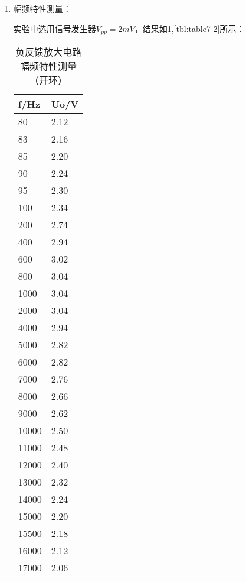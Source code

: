 \documentclass[dvipsnames, svgnames,a4paper,11pt]{article}
\begin{document}
\begin{itemize}
\begin{enumerate}
				\item 幅频特性测量：
				
					实验中选用信号发生器$V_{pp}=2mV$，结果如\cref{tbl:table7-1},\cref{tbl:table7-2}所示：
					
					\begin{table}[htbp]
						\begin{minipage}{.5\linewidth}
							\centering
							\begin{tabular}{|ll|} 
								\hline
								f/Hz  & Uo/V  \\ 
								\hline
								80    & 2.12  \\
								83    & 2.16  \\
								85    & 2.20  \\
								90    & 2.24  \\
								95    & 2.30  \\
								100   & 2.34  \\
								200   & 2.74  \\
								400   & 2.94  \\
								600   & 3.02  \\
								800   & 3.04  \\
								1000  & 3.04  \\
								2000  & 3.04  \\
								4000  & 2.94  \\
								5000  & 2.82  \\
								6000  & 2.82  \\
								7000  & 2.76  \\
								8000  & 2.66  \\
								9000  & 2.62  \\
								10000 & 2.50  \\
								11000 & 2.48  \\
								12000 & 2.40  \\
								13000 & 2.32  \\
								14000 & 2.24  \\
								15000 & 2.20  \\
								15500 & 2.18  \\
								16000 & 2.12  \\
								17000 & 2.06  \\
								\hline
							\end{tabular}
							\caption{负反馈放大电路幅频特性测量（开环）}
							\label{tbl:table7-1}
						\end{minipage}%
						\begin{minipage}{.5\linewidth}

\end{minipage}
\end{table}
\end{enumerate}
\end{itemize}
\end{document}
